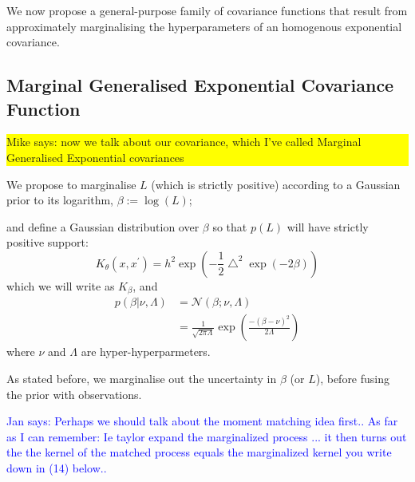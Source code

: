 \documentclass{article}
\newcommand\jansays[1]{\textcolor{blue}{Jan says: #1}}
\newcommand\mikesays[1]{\colorbox{yellow}{\parbox{\columnwidth}{Mike says: #1}}}
\begin{document}
We now propose a general-purpose family of covariance functions that result from approximately marginalising the hyperparameters of an homogenous exponential covariance. 

\subsection{Marginal Generalised Exponential Covariance Function} \mikesays{now we talk about our covariance, which I've called Marginal Generalised Exponential covariances}




We propose to marginalise $L$ (which is strictly positive) according to a Gaussian prior to its logarithm, $\beta := \log(L)$;
%  


 and define a Gaussian distribution over $\beta$ so that $p(L)$ will have strictly positive support: 
\begin{equation}\label{betaSEkernel}
K_\theta(x,x^\prime) = h^2 \exp \left( -\frac{1}{2}\bigtriangleup^2 \exp(-2\beta) \right)
\end{equation}
which we will write as $K_\beta$, and
\begin{align}
p(\beta|\nu,\Lambda) &= \mathcal{N}(\beta; \nu, \Lambda) \nonumber\\
&= \frac{1}{\sqrt{2 \pi \Lambda}} \exp \left( \frac{ -(\beta - \nu)^2}{2\Lambda} \right) \label{betapdf}
\end{align}
where $\nu$ and $\Lambda$ are hyper-hyperparmeters.

As stated before, we marginalise out the uncertainty in $\beta$ (or $L$), before fusing the prior with observations. 

\jansays{Perhaps we should talk about the moment matching idea first.. As far as I can remember: Ie taylor expand the marginalized process ... it then turns out the the kernel of the matched process equals the marginalized kernel you write down in (14) below..}
\end{document}
